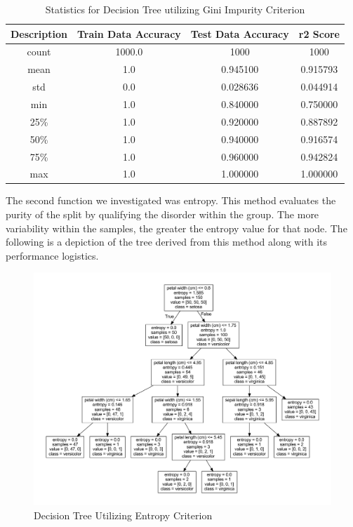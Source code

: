 \documentclass[journal]{IEEEtran}
\begin{document}
\begin{table}[h!]
\centering
\begin{tabular}{ c | c c c }
    Description & Train Data Accuracy & Test Data Accuracy & r2 Score \\ 
\hline
count & 1000.0    & 1000 & 1000  \\
mean  &    1.0    &    0.945100   &  0.915793 \\
std   &    0.0    &    0.028636   &  0.044914 \\
min   &    1.0    &    0.840000   &  0.750000 \\
25\%  &     1.0   &     0.920000  &   0.887892 \\
50\%  &     1.0   &     0.940000  &   0.916574 \\
75\%  &     1.0   &     0.960000  &   0.942824 \\
max   &   1.0     &   1.000000    & 1.000000
\end{tabular}
\caption{Statistics for Decision Tree utilizing Gini Impurity Criterion}
\end{table}

The second function we investigated was entropy. This method evaluates the purity of the split by qualifying the disorder within the group. The more variability within the samples, the greater the entropy value for that node. The following is a depiction of the tree derived from this method along with its performance logistics. 

\begin{figure}[h!]
\includegraphics[scale=.25]{iris2.pdf}
\centering
\caption{Decision Tree Utilizing Entropy Criterion}
\end{figure}
\end{document}
